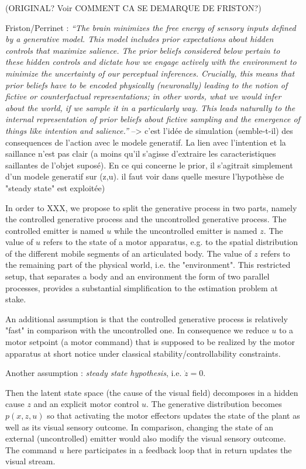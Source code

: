 \documentclass[12pt,twoside,openright]{article}
\begin{document}
	{\color{blue} (ORIGINAL? Voir COMMENT CA SE DEMARQUE DE FRISTON?) 
		
	Friston/Perrinet : \emph{``The brain minimizes the free energy of sensory inputs defined by a generative model. This model includes prior expectations about hidden controls that maximize salience.	 
	The prior beliefs considered below pertain to these hidden controls and dictate how we engage actively with the environment to minimize the uncertainty of our perceptual inferences. Crucially, this means that prior beliefs have to be encoded physically (neuronally) leading to the notion of fictive or counterfactual representations; in other words, what we would infer about the world, if we sample it in a particularly way. This leads naturally to the internal representation of prior beliefs about fictive sampling and the emergence of things like intention and salience.''} --> c'est l'idée de simulation (semble-t-il) des consequences de l'action avec le modele generatif. La lien avec l'intention et la saillance n'est pas clair (a moins qu'il s'agisse d'extraire les caracteristiques saillantes de l'objet suposé). En ce qui concerne le prior, il s'agitrait simplement d'un modele generatif sur (z,u). il faut voir dans quelle mesure l'hypothèse de "steady state" est exploitée)
		
	In order to XXX, we propose to split the generative process in two parts, namely the controlled generative process and the uncontrolled generative process. The controlled emitter is named $u$ while the uncontrolled emitter is named $z$. The value of $u$ refers to the state of a motor apparatus, e.g. to the spatial distribution of the different mobile segments of an articulated body. The value of $z$ refers to the remaining part of the physical world, i.e. the "environment". This restricted setup, that separates a body and an environment the form of two parallel processes,  provides a substantial simplification to the estimation problem at stake.  	
	
	An additional assumption is that the controlled generative process is relatively "fast" in comparison with the uncontrolled one. In consequence we reduce $u$ to  a motor setpoint (a motor command) that is supposed to be realized by the motor apparatus at short notice under classical stability/controllability constraints.
	
	Another assumption : \emph{steady state hypothesis}, i.e. $\dot{z} = 0$.  
	
	Then the latent state space (the cause of the visual field) decomposes in a hidden cause $z$ and an explicit motor control $u$. The generative distribution becomes $p(x, z, u)$ so that activating the motor effectors updates the state of the plant as well as its visual sensory outcome. In comparison,  changing the state of an external (uncontrolled) emitter would also modify the visual sensory outcome. The command $u$ here participates in a feedback loop that in return updates the visual stream.
		
}
\end{document}

